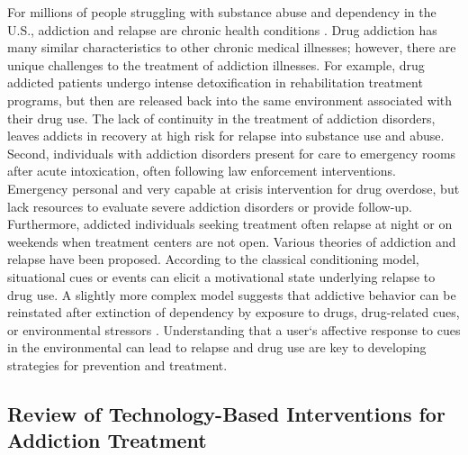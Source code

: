 \documentclass[sigconf]{acmart}
\begin{document}
For millions of people struggling with substance abuse and dependency in 
the U.S., addiction and relapse are chronic health conditions \cite{boyer10}. 
Drug addiction has many similar characteristics to other chronic medical 
illnesses; however, there are unique challenges to the treatment of addiction
illnesses. For example, drug addicted patients undergo intense detoxification 
in rehabilitation treatment programs, but then are released back into the same 
environment associated with their drug use. The lack of continuity in the 
treatment of addiction disorders, leaves addicts in recovery at high risk for
relapse into substance use and abuse. Second, individuals with addiction 
disorders present for care to emergency rooms after acute intoxication, often 
following law enforcement interventions. Emergency personal and very capable 
at crisis intervention for drug overdose, but lack resources to evaluate severe 
addiction disorders or provide follow-up. Furthermore, addicted individuals 
seeking treatment often relapse at night or on weekends when treatment centers 
are not open. Various theories of addiction and relapse have been proposed. 
According to the classical conditioning model, situational cues or events can 
elicit a motivational state underlying relapse to drug use. A slightly more 
complex model suggests that addictive behavior can be reinstated after 
extinction of dependency by exposure to drugs, drug-related cues, or 
environmental stressors \cite{shaham03}. Understanding that a user`s affective
response to cues in the environmental can lead to relapse and drug use are key 
to developing strategies for prevention and treatment. 


\subsection{Review of Technology-Based Interventions for Addiction Treatment}
\end{document}
